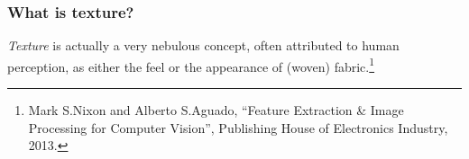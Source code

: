 \documentclass[notheorems,serif,table,compress]{beamer}  %
\begin{document}
%
%
%
%
%
%
%
%
%
%
%
%
%


\begin{frame}
\frametitle{What is texture?}
{\color{blue}\emph{Texture}} is actually a very nebulous concept, often attributed to human perception, as either the feel or the appearance of (woven) fabric.\footnote{Mark S.Nixon and Alberto S.Aguado, ``Feature Extraction \& Image Processing for Computer Vision'', Publishing House of Electronics Industry, 2013.}
\end{frame}
\end{document}
